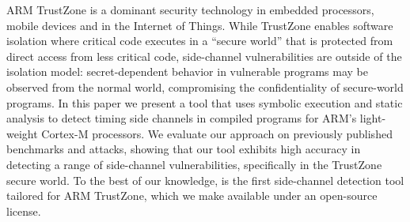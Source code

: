 ARM TrustZone is a dominant security technology in embedded processors,
mobile devices and in the Internet of Things. While TrustZone enables
software isolation where critical code executes in a ``secure world'' that
is protected from direct access from less critical code, side-channel
vulnerabilities are outside of the isolation model: secret-dependent
behavior in vulnerable programs may be observed from the normal world,
compromising the confidentiality of secure-world programs. In this paper we
present a tool that uses symbolic execution and static analysis to detect
timing side channels in compiled programs for ARM's light-weight Cortex-M
processors. We evaluate our approach on previously published benchmarks and
attacks, showing that our tool \tool{} exhibits high accuracy in detecting
a range of side-channel vulnerabilities, specifically in the TrustZone
secure world. To the best of our knowledge, \tool{} is the first
side-channel detection tool tailored for ARM TrustZone, which we make
available under an open-source license.
